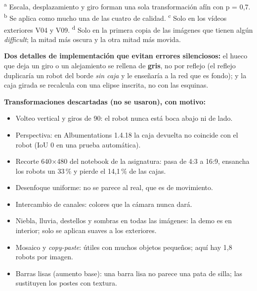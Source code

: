 \documentclass[11pt,a4paper]{article}
\newcommand{\gr}{\textdegree{}}
\begin{document}
{\footnotesize \textsuperscript{a} Escala, desplazamiento y giro forman una sola transformación afín con p = 0,7. \textsuperscript{b} Se aplica como mucho una de las cuatro de calidad. \textsuperscript{c} Solo en los vídeos exteriores V04 y V09. \textsuperscript{d} Solo en la primera copia de las imágenes que tienen algún \emph{difficult}; la mitad más oscura y la otra mitad más movida.\par}

\textbf{Dos detalles de implementación que evitan errores silenciosos:} el hueco que deja un giro o un alejamiento se rellena de \textbf{gris}, no por reflejo (el reflejo duplicaría un robot del borde \emph{sin caja} y le enseñaría a la red que es fondo); y la caja girada se recalcula con una elipse inscrita, no con las esquinas.

\textbf{Transformaciones descartadas (no se usaron), con motivo:}
\begin{itemize}
  \item Volteo vertical y giros de 90\gr: el robot nunca está boca abajo ni de lado.
  \item Perspectiva: en Albumentations 1.4.18 la caja devuelta no coincide con el robot (IoU 0 en una prueba automática).
  \item Recorte 640$\times$480 del notebook de la asignatura: pasa de 4:3 a 16:9, ensancha los robots un 33\,\% y pierde el 14,1\,\% de las cajas.
  \item Desenfoque uniforme: no se parece al real, que es de movimiento.
  \item Intercambio de canales: colores que la cámara nunca dará.
  \item Niebla, lluvia, destellos y sombras en todas las imágenes: la demo es en interior; solo se aplican suaves a los exteriores.
  \item Mosaico y \emph{copy-paste}: útiles con muchos objetos pequeños; aquí hay 1,8 robots por imagen.
  \item Barras lisas (aumento base): una barra lisa no parece una pata de silla; las sustituyen los postes con textura.
\end{itemize}
\end{document}
